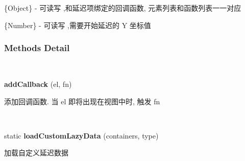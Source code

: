 \documentclass[letterpaper,10pt,english]{sphinxmanual}
\begin{document}
\begin{fulllineitems}
\label{api/component/datalazyload/index:DataLazyload.callbacks}
\{Object\} - 可读写 ,和延迟项绑定的回调函数, 元素列表和函数列表一一对应

\end{fulllineitems}



\begin{fulllineitems}
\label{api/component/datalazyload/index:DataLazyload.threshold}
\{Number\} - 可读写 ,需要开始延迟的 Y 坐标值

\end{fulllineitems}



\subsubsection{Methods Detail}
\label{api/component/datalazyload/index:methods-detail}

\begin{fulllineitems}
\label{api/component/datalazyload/index:DataLazyload.addCallback}~
\begin{DUlineblock}{0em}
\item[] \textbf{addCallback} (el, fn)
\item[] 添加回调函数. 当 el 即将出现在视图中时, 触发 fn
\end{DUlineblock}

\end{fulllineitems}



\begin{fulllineitems}
\label{api/component/datalazyload/index:DataLazyload.loadCustomLazyData}~
\begin{DUlineblock}{0em}
\item[] static \textbf{loadCustomLazyData} (containers, type)
\item[] 加载自定义延迟数据
\end{DUlineblock}

\end{fulllineitems}
\end{document}
